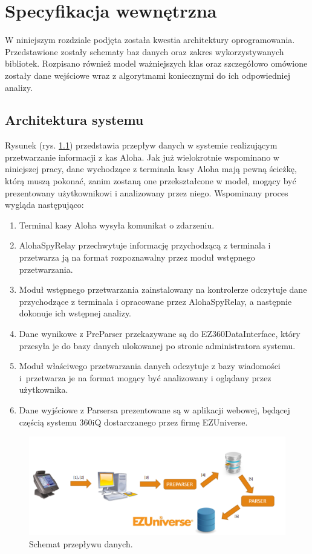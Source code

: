 \documentclass[a4paper]{book}
\begin{document}
\chapter{Specyfikacja wewnętrzna}
\label{rozdzial5}
W niniejszym rozdziale podjęta została kwestia architektury oprogramowania. Przedstawione zostały schematy baz danych oraz zakres wykorzystywanych bibliotek. Rozpisano również model ważniejszych klas oraz szczegółowo omówione zostały dane wejściowe wraz z algorytmami koniecznymi do ich odpowiedniej analizy.
\section{Architektura systemu}
Rysunek (rys. \ref{fig:schemat_przeplywu_danych}) przedstawia przepływ danych w systemie realizującym przetwarzanie informacji z kas Aloha.
Jak już wielokrotnie wspominano w niniejszej pracy, dane wychodzące z terminala kasy Aloha mają pewną ścieżkę, którą muszą pokonać, zanim zostaną one przekształcone w model, mogący być prezentowany użytkownikowi i analizowany przez niego. Wspominany proces wygląda następująco:
 \begin{enumerate}
	\item Terminal kasy Aloha wysyła komunikat o zdarzeniu.
	\item AlohaSpyRelay przechwytuje informację przychodzącą z terminala i przetwarza ją na format rozpoznawalny przez moduł wstępnego przetwarzania.
	\item Moduł wstępnego przetwarzania zainstalowany na kontrolerze odczytuje dane przychodzące z terminala i opracowane przez AlohaSpyRelay, a następnie dokonuje ich wstępnej analizy.
	\item Dane wynikowe z PreParser przekazywane są do EZ360DataInterface, który przesyła je do bazy danych ulokowanej po stronie administratora systemu.
	\item Moduł właściwego przetwarzania danych odczytuje z bazy wiadomości i~przetwarza je na format mogący być analizowany i oglądany przez użytkownika.
	\item Dane wyjściowe z Parsersa prezentowane są w aplikacji webowej, będącej częścią systemu 360iQ dostarczanego przez firmę EZUniverse.
\end{enumerate}
\begin{figure}[t]
	\centering
	\includegraphics[width=\textwidth]{./img/schemat_przeplywu_danych.png}
	\caption{Schemat przepływu danych.}
	\label{fig:schemat_przeplywu_danych}
\end{figure}
\end{document}
